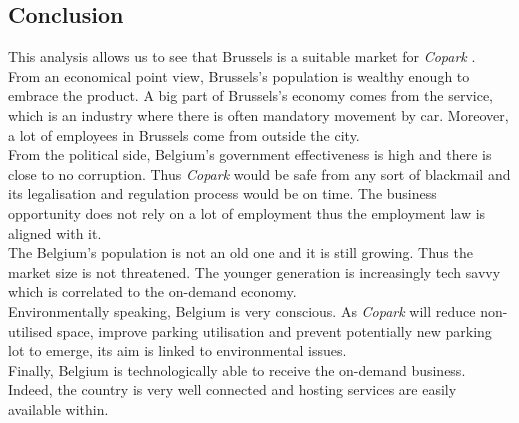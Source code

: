 \documentclass[12pt,a4paper,oneside]{book}
\newcommand{\bp}{\textit{Copark }}
\begin{document}
\subsection{Conclusion}
This analysis allows us to see that Brussels is a suitable market for \bp.\\
From an economical point view, Brussels's population is wealthy enough to embrace the product. A big part of Brussels's economy comes from the service, which is an industry where there is often mandatory movement by car. Moreover, a lot of employees in Brussels come from outside the city.\\
From the political side, Belgium's government effectiveness is high and there is close to no corruption. Thus \bp would be safe from any sort of blackmail and its legalisation and regulation process would be on time. The business opportunity does not rely on a lot of employment thus the employment law is aligned with it.\\
The Belgium's population is not an old one and it is still growing. Thus the market size is not threatened. The younger generation is increasingly tech savvy which is correlated to the on-demand economy.\\
Environmentally speaking, Belgium is very conscious. As \bp will reduce non-utilised space, improve parking utilisation and prevent potentially new parking lot to emerge, its aim is linked to environmental issues.\\
Finally, Belgium is technologically able to receive the on-demand business. Indeed, the country is very well connected and hosting services are easily available within.
\end{document}
